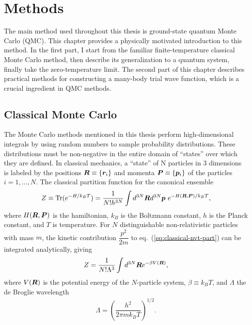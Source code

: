 \chapter{Methods} \label{chap:method}

The main method used throughout this thesis is ground-state quantum Monte Carlo (QMC). This chapter provides a physically motivated introduction to this method.
In the first part, I start from the familiar finite-temperature classical Monte Carlo method, then describe its generalization to a quantum system, finally take the zero-temperature limit.
The second part of this chapter describes practical methods for constructing a many-body trial wave function, which is a crucial ingredient in QMC methods.

\section{Classical Monte Carlo}
The Monte Carlo methods mentioned in this thesis perform high-dimensional integrals by using random numbers to sample probability distributions. These distributions must be non-negative in the entire domain of ``states'' over which they are defined. In classical mechanics, a ``state'' of N particles in $3$ dimensions is labeled by the positions $\boldsymbol{R}\equiv\{\boldsymbol{r}_i\}$ and momenta $\boldsymbol{P}\equiv\{\boldsymbol{p}_i\}$ of the particles $i=1,\dots,N$. The classical partition function for the canonical ensemble
\begin{align} \label{eq:classical-nvt-part}
Z \equiv \text{Tr}(e^{-H/k_BT}) = \dfrac{1}{N!h^{3N}} \int d^{3N}\boldsymbol{R} d^{3N}\boldsymbol{p}~e^{-H(\boldsymbol{R}, \boldsymbol{P})/k_BT},
\end{align}
where $H(\boldsymbol{R}, \boldsymbol{P})$ is the hamiltonian, $k_B$ is the Boltzmann constant, $h$ is the Planck constant, and $T$ is temperature. For $N$ distinguishable non-relativistic particles with mass $m$, the kinetic contribution $\dfrac{p^2}{2m}$ to eq.~(\ref{eq:classical-nvt-part}) can be integrated analytically, giving
\begin{align}\label{eq:classical-nvt-part-v}
Z = \dfrac{1}{N!\Lambda^{3}} \int d^{3N}\boldsymbol{R} e^{-\beta V(\boldsymbol{R})},
\end{align}
where $V(\boldsymbol{R})$ is the potential energy of the $N$-particle system, $\beta\equiv k_BT$, and $\Lambda$ the de Broglie wavelength
\begin{align} \label{eq:debroglie}
\Lambda = \left(
\dfrac{h^2}{2\pi mk_BT}
\right)^{1/2}.
\end{align}

